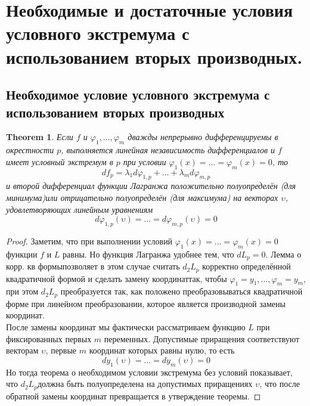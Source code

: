 \documentclass[a4paper,12pt]{article} %
\newtheorem{theorem}{Theorem}
\theoremstyle{definition}
\begin{document}
\section{Необходимые и достаточные условия условного экстремума с использованием вторых производных.}
\subsection{Необходимое условие условного экстремума с использованием вторых производных}
\begin{theorem}
	Если $f$ и $\varphi_1,\dots,\varphi_m$ дважды непрерывно дифференцируемы в окрестности $p$, выполняется линейная независимость дифференциалов и $f$ имеет условный экстремум в $p$ при условии $\varphi_1(x) = \dots = \varphi_m(x) = 0$, то
	$$d f_p = \lambda_1 d \varphi_{1, p} + \dots + \lambda_m d \varphi_{m, p}$$
	и второй дифференциал функции Лагранжа положительно полуопределён (для минимума)или отрицательно полуопределён (для максимума) на векторах $\upsilon$, удовлетворяющих линейным уравнениям
	$$d \varphi_{1, p}(\upsilon) = \dots = d \varphi_{m, p}(\upsilon) = 0$$
\end{theorem}
\begin{proof}
	Заметим, что при выполнении условий $\varphi_1(x) = \dots = \varphi_m(x) = 0$ функции $f$ и $L$ равны. Но функция Лагранжа удобнее тем, что $dL_p= 0$. Лемма о корр. кв формыпозволяет в этом случае считать $d_2L_p$ корректно определённой квадратичной формой и сделать замену координаттак, чтобы $\varphi_1=y_1,\dots, \varphi_m=y_m$, при этом $d_2L_p$ преобразуется так, как положено преобразовываться квадратичной форме при линейном преобразовании, которое является производной замены координат.\\
	После замены координат мы фактически рассматриваем функцию $L$ при фиксированных первых $m$ переменных. Допустимые приращения соответствуют векторам $\upsilon$, первые $m$ координат которых равны нулю, то есть
	\begin{equation}
		d y_1(\upsilon) = \dots = d y_m(\upsilon) = 0
	\end{equation}
	Но тогда теорема о необходимом условии экстремума без условий показывает, что $d_2L_p$должна быть полуопределена на допустимых приращениях $\upsilon$, что после обратной замены координат превращается в утверждение теоремы.
\end{proof}
\end{document}
